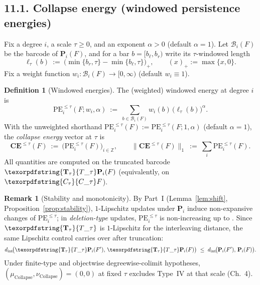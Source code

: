 \documentclass[11pt]{article}
\numberwithin{equation}{section}
\theoremstyle{plain}
\theoremstyle{definition}
\theoremstyle{remark}
\DeclareRobustCommand{\hyp}{\nobreakdash-}
\theoremstyle{plain}
\theoremstyle{definition}
\numberwithin{equation}{section}
\theoremstyle{definition}
\newtheorem{definition}[theorem]{Definition}
\newtheorem{remark}[theorem]{Remark}
\DeclareRobustCommand{\Ttau}{\texorpdfstring{\ensuremath{\mathbf{T}_{\tau}}}{T\_\tau}}
\DeclareRobustCommand{\Ctau}{\texorpdfstring{\ensuremath{C_{\tau}}}{C\_\tau}}
\DeclareRobustCommand{\muc}{\mu_{\mathrm{Collapse}}}
\DeclareRobustCommand{\nuc}{\nu_{\mathrm{Collapse}}}
\DeclareRobustCommand{\fqi}{\text{f.q.i.}}
\numberwithin{equation}{section}
\theoremstyle{plain}
\theoremstyle{definition}
\theoremstyle{remark}
\providecommand{\Cfun}[1]{\mathsf{C}_{#1}}
\providecommand{\Tfun}[1]{\mathbf{T}_{#1}}
\providecommand{\Ctau}{\Cfun{\tau}}
\providecommand{\Ttau}{\Tfun{\tau}}
\providecommand{\muc}{\mu_{\mathrm{Collapse}}}
\providecommand{\nuc}{\nu_{\mathrm{Collapse}}}
\begin{document}
\subsection*{11.1. Collapse energy (windowed persistence energies)}
Fix a degree $i$, a scale $\tau\ge 0$, and an exponent $\alpha>0$ (default $\alpha=1$). Let $\mathcal{B}_{i}(F)$ be the barcode of $\mathbf{P}_i(F)$, and for a bar $b=[b_{\ell},b_{r})$ write its $\tau$-windowed length
\[
  \ell_{\tau}(b)\ :=\ \bigl(\min\{b_{r},\tau\}-\min\{b_{\ell},\tau\}\bigr)_{+},\qquad (x)_{+}:=\max\{x,0\}.
\]
Fix a weight function $w_i:\mathcal{B}_i(F)\to[0,\infty)$ (default $w_i\equiv 1$).
\begin{definition}[Windowed energies]\label{def:11-PE}
The (weighted) windowed energy at degree $i$ is
\[
  \mathrm{PE}_{i}^{\le \tau}(F;w_i,\alpha)\ :=\ \sum_{b\in \mathcal{B}_{i}(F)} w_i(b)\,\big(\ell_{\tau}(b)\big)^{\alpha}.
\]
With the unweighted shorthand $\mathrm{PE}_{i}^{\le \tau}(F):=\mathrm{PE}_{i}^{\le \tau}(F;1,\alpha)$ (default $\alpha=1$), the \emph{collapse energy} vector at $\tau$ is
\[
  \mathbf{CE}^{\le \tau}(F)\ :=\ \big(\mathrm{PE}_{i}^{\le \tau}(F)\big)_{i\in\mathbb{Z}},\qquad \|\mathbf{CE}^{\le \tau}(F)\|_{1}\ :=\ \sum_{i}\mathrm{PE}_{i}^{\le \tau}(F).
\]
All quantities are computed on the truncated barcode $\Ttau\mathbf{P}_i(F)$ (equivalently, on $\Ctau F$).
\end{definition}

\begin{remark}[Stability and monotonicity]
By Part~I (Lemma~\ref{lem:shift}, Proposition~\ref{prop:stability}), $1$-Lipschitz updates under $\mathbf{P}_i$ induce non\hyp expansive changes of $\mathrm{PE}_{i}^{\le \tau}$; in \emph{deletion\hyp type} updates, $\mathrm{PE}_{i}^{\le \tau}$ is non\hyp increasing up to \fqi.
Since $\Ttau$ is $1$-Lipschitz for the interleaving distance, the same Lipschitz control carries over after truncation:
\[
  d_{\mathrm{int}}\!\big(\Ttau\mathbf{P}_i(F'),\,\Ttau\mathbf{P}_i(F)\big)\ \le\ d_{\mathrm{int}}\!\big(\mathbf{P}_i(F'),\,\mathbf{P}_i(F)\big).
\]
Under finite-type and objectwise degreewise-colimit hypotheses, $(\muc,\nuc)=(0,0)$ at fixed $\tau$ excludes Type~IV at that scale (Ch.~4).
\end{remark}
\end{document}
